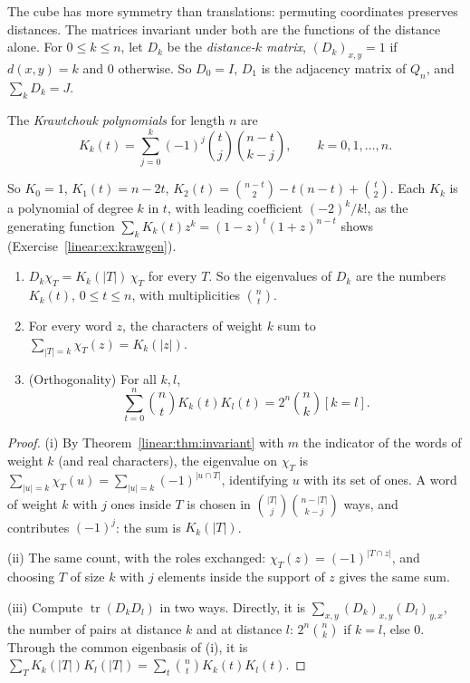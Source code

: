 The cube has more symmetry than translations: permuting coordinates preserves distances. The matrices invariant under both are
the functions of the distance alone. For $0\le k\le n$, let $D_k$ be the \emph{distance-$k$ matrix}, $(D_k)_{x,y}=1$ if $d(x,y)=k$
and $0$ otherwise. So $D_0=I$, $D_1$ is the adjacency matrix of $Q_n$, and $\sum_kD_k=J$.

\begin{definition}\label{linear:def:krawtchouk}
The \emph{Krawtchouk polynomials} for length $n$ are
\[
K_k(t)=\sum_{j=0}^k(-1)^j\binom tj\binom{n-t}{k-j},\qquad k=0,1,\dots,n.
\]
\end{definition}

So $K_0=1$, $K_1(t)=n-2t$, $K_2(t)=\binom{n-t}2-t(n-t)+\binom t2$. Each $K_k$ is a polynomial of degree $k$ in $t$, with leading
coefficient $(-2)^k/k!$, as the generating function $\sum_kK_k(t)z^k=(1-z)^t(1+z)^{n-t}$ shows (Exercise~\ref{linear:ex:krawgen}).

\begin{theorem}\label{linear:thm:krawtchouk}
\begin{enumerate}[label=(\roman*)]
\item $D_k\chi_T=K_k(|T|)\,\chi_T$ for every $T$. So the eigenvalues of $D_k$ are the numbers $K_k(t)$, $0\le t\le n$, with
multiplicities $\binom nt$.
\item For every word $z$, the characters of weight $k$ sum to $\sum_{|T|=k}\chi_T(z)=K_k(|z|)$.
\item (Orthogonality) For all $k,l$,
\[
\sum_{t=0}^n\binom ntK_k(t)K_l(t)=2^n\binom nk[k=l].
\]
\end{enumerate}
\end{theorem}
\begin{proof}
(i) By Theorem~\ref{linear:thm:invariant} with $m$ the indicator of the words of weight $k$ (and real characters), the eigenvalue on
$\chi_T$ is $\sum_{|u|=k}\chi_T(u)=\sum_{|u|=k}(-1)^{|u\cap T|}$, identifying $u$ with its set of ones. A word of weight $k$ with
$j$ ones inside $T$ is chosen in $\binom{|T|}j\binom{n-|T|}{k-j}$ ways, and contributes $(-1)^j$: the sum is $K_k(|T|)$.

(ii) The same count, with the roles exchanged: $\chi_T(z)=(-1)^{|T\cap z|}$, and choosing $T$ of size $k$ with $j$ elements inside
the support of $z$ gives the same sum.

(iii) Compute $\operatorname{tr}(D_kD_l)$ in two ways. Directly, it is $\sum_{x,y}(D_k)_{x,y}(D_l)_{y,x}$, the number of pairs at
distance $k$ and at distance $l$: $2^n\binom nk$ if $k=l$, else $0$. Through the common eigenbasis of (i), it is
$\sum_TK_k(|T|)K_l(|T|)=\sum_t\binom ntK_k(t)K_l(t)$.
\end{proof}

